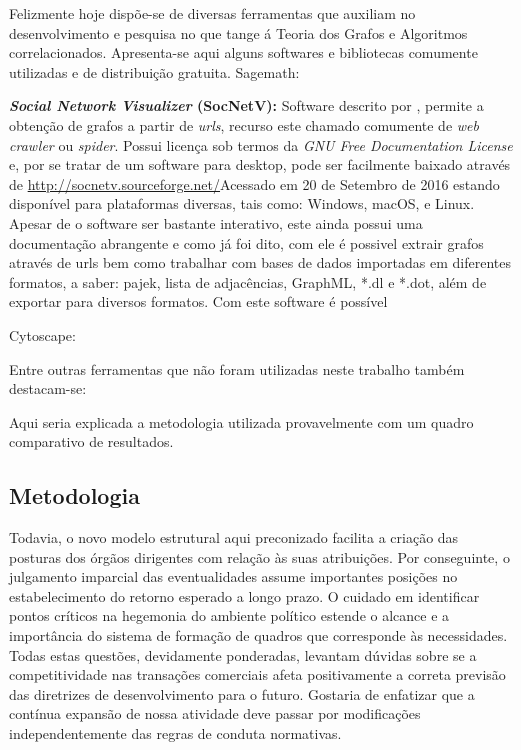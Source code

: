 \documentclass{endm}
\begin{document}
Felizmente hoje dispõe-se de diversas ferramentas que auxiliam no desenvolvimento e pesquisa no que tange á Teoria dos Grafos e Algoritmos correlacionados. Apresenta-se aqui alguns softwares e bibliotecas comumente utilizadas e de distribuição gratuita.
Sagemath:

\textbf{\emph{Social Network Visualizer} (SocNetV):} Software descrito por \cite{tanilson01:MSc}, permite a obtenção de grafos a partir de \emph{urls}, recurso este chamado comumente de \emph{web crawler} ou \emph{spider}. Possui licença sob termos da \emph{GNU Free Documentation License} e, por se tratar de um software para desktop, pode ser facilmente baixado através de \url{http://socnetv.sourceforge.net/}\footnotesize{Acessado em 20 de Setembro de 2016} estando disponível para plataformas diversas, tais como: Windows, macOS, e Linux. Apesar de o software ser bastante interativo, este ainda possui uma documentação abrangente e como já foi dito, com ele é possivel extrair grafos através de urls bem como trabalhar com bases de dados importadas em diferentes formatos, a saber: pajek, lista de adjacências, GraphML, *.dl e *.dot, além de exportar para diversos formatos. Com este software é possível %

Cytoscape:


Entre outras ferramentas que não foram utilizadas neste trabalho também destacam-se:




Aqui seria explicada a metodologia utilizada provavelmente com um quadro comparativo de resultados.
\subsection{Metodologia}

   Todavia, o novo modelo estrutural aqui preconizado facilita a criação das posturas dos órgãos dirigentes com relação às suas atribuições. Por conseguinte, o julgamento imparcial das eventualidades assume importantes posições no estabelecimento do retorno esperado a longo prazo. O cuidado em identificar pontos críticos na hegemonia do ambiente político estende o alcance e a importância do sistema de formação de quadros que corresponde às necessidades. Todas estas questões, devidamente ponderadas, levantam dúvidas sobre se a competitividade nas transações comerciais afeta positivamente a correta previsão das diretrizes de desenvolvimento para o futuro. Gostaria de enfatizar que a contínua expansão de nossa atividade deve passar por modificações independentemente das regras de conduta normativas.
\end{document}
